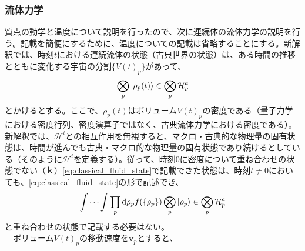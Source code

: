 \subsubsection{流体力学}
質点の動学と温度について説明を行ったので、次に連続体の流体力学の説明を行う。記載を簡便にするために、温度についての記載は省略することにする。新解釈では、時刻$t$における連続流体の状態（古典世界の状態）は、ある時間の推移とともに変化する宇宙の分割$\{V(t)_p\}$があって、
\begin{equation}
    \label{eq:classical_fluid_state}
    \bigotimes_p \ket{\rho_p(t)} \in \bigotimes_p \mathcal{H}_p^a
\end{equation}
とかけるとする。ここで、$\rho_p(t)$はボリューム$V(t)_p$の密度である（量子力学における密度行列、密度演算子ではなく、古典流体力学における密度である）。新解釈では、$\mathcal{H}^i$との相互作用を無視すると、マクロ・古典的な物理量の固有状態は、時間が進んでも古典・マクロ的な物理量の固有状態であり続けるとしている（そのように$\mathcal{H}^i$を定義する）。従って、時刻$0$に密度について重ね合わせの状態でない（ｋ）\eqref{eq:classical_fluid_state}で記載できた状態は、時刻$t \neq 0$においても、\eqref{eq:classical_fluid_state}の形で記述でき、
\begin{equation}
   \int \cdots \int \prod_p \mathrm{d}\rho_p f(\{\rho_p\}) \bigotimes_p \ket{\rho_p} \in \bigotimes_p \mathcal{H}_p^a
\end{equation}
と重ね合わせの状態で記載する必要はない。\\
　ボリューム$V(t)_p$の移動速度を$\bm{v}_p$とすると、